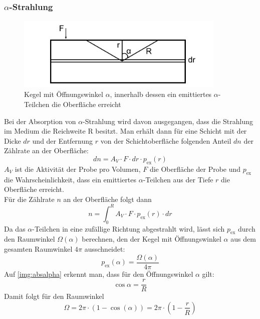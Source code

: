 \subsubsection{$\alpha$-Strahlung}
\begin{figure}[H]
\begin{center}
  \includegraphics[width=10cm]{../img/absalpha}
  \caption{Kegel mit Öffnungswinkel $\alpha$,
  innerhalb dessen ein emittiertes $\alpha$-Teilchen die Oberfläche erreicht}
  \label{img:absalpha}
\end{center}
\end{figure}
Bei der Absorption von $\alpha$-Strahlung wird davon ausgegangen, dass die Strahlung im Medium
die Reichweite R besitzt.
Man erhält dann für eine Schicht mit der Dicke $dr$ und der Entfernung $r$ von der Schichtoberfläche
folgenden Anteil $dn$ der Zählrate an der Oberfläche:
\begin{equation}
  dn=A_V \cdot F \cdot dr \cdot p_{\text{ex}}(r)
\end{equation}
$A_V$ ist die Aktivität der Probe pro Volumen, $F$ die Oberfläche der Probe und $p_{\text{ex}}$
die Wahrscheinlichkeit, dass ein emittiertes $\alpha$-Teilchen aus der Tiefe $r$ die Oberfläche erreicht.\\
Für die Zählrate $n$ an der Oberfläche folgt dann
\begin{equation}
  n=\int_{0}^{R}{A_V \cdot F \cdot p_{\text{ex}}(r) \cdot dr}
\end{equation}
Da das $\alpha$-Teilchen in eine zufällige Richtung abgestrahlt wird,
lässt sich $p_{\text{ex}}$ durch den Raumwinkel $\Omega(\alpha)$ berechnen,
den der Kegel mit Öffnungswinkel $\alpha$
aus dem gesamten Raumwinkel $4\pi$ ausschneidet:
\begin{equation}
  p_{\text{ex}}(\alpha)=\frac{\Omega(\alpha)}{4\pi}
\end{equation}
Auf \autoref{img:absalpha} erkennt man,
dass für den Öffnungswinkel $\alpha$ gilt:
\begin{equation}
  \cos \alpha = \frac{r}{R}
\end{equation}
Damit folgt für den Raumwinkel
\begin{equation}
  \Omega=2\pi \cdot (1-\cos(\alpha))=2\pi \cdot (1-\frac{r}{R})
\end{equation}
